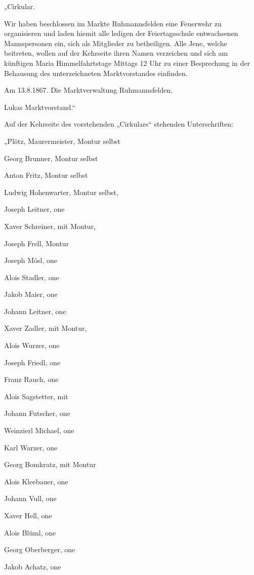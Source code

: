 \documentclass[12pt,a4pager]{book}
\begin{document}
„Cirkular.



Wir haben beschlossen im Markte Ruhmannsfelden eine Feuerwehr zu organisieren
und laden hiemit alle ledigen der Feiertagsschule entwachsenen Mannspersonen
ein, sich als Mitglieder zu betheiligen. Alle Jene, welche beitreten, wollen auf
der Kehrseite ihren Namen verzeichen und sich am künftigen Maria
Himmelfahrtstage Mittags 12 Uhr zu einer Besprechung in der Behausung des
unterzeichneten Marktvorstandes einfinden.



Am 13.8.1867. Die Marktverwaltung Ruhmannsfelden.

Lukas Marktvorstand.“



Auf der Kehrseite des vorstehenden „Cirkulars“ stehenden Unterschriften:



„Plötz, Maurermeister, Montur selbst

Georg Brunner, Montur selbst

Anton Fritz, Montur selbst

Ludwig Hohenwarter, Montur selbst,

Joseph Leitner, one

Xaver Schreiner, mit Montur,

Joseph Frell, Montur

Joseph Mösl, one

Alois Stadler, one

Jakob Maier, one

Johann Leitner, one

Xaver Zadler, mit Montur,

Alois Wurzer, one

Joseph Friedl, one

Franz Rauch, one

Alois Sagstetter, mit

Johann Futscher, one

Weinzierl Michael, one

Karl Warzer, one

Georg Bomkratz, mit Montur

Alois Kleebauer, one



Johann Vull, one

Xaver Hell, one

Alois Blüml, one

Georg Oberberger, one

Jakob Achatz, one
\end{document}
